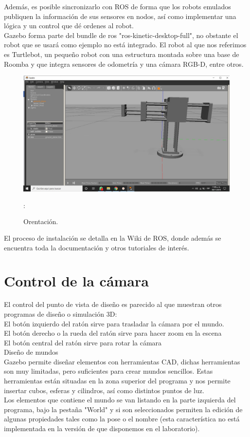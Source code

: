 \documentclass[11pt,a4paper,oldfontcommands,oneside]{memoir}
\begin{document}
Además, es posible sincronizarlo con ROS de forma que los robots emulados publiquen la información de sus sensores en nodos, así como implementar una lógica y un control que dé ordenes al robot.\\
Gazebo forma parte del bundle de ros "ros-kinetic-desktop-full", no obstante el robot que se usará como ejemplo no está integrado. El robot al que nos referimos es Turtlebot, un pequeño robot con una estructura montada sobre una base de Roomba y que integra sensores de odometría y una cámara RGB-D, entre otros.
\begin{figure}
\begin{center}
\includegraphics[scale=.30]{102.jpeg}
\end{center}
\caption{Orentación.}
\label{blender}:
\end{figure}
El proceso de instalación se detalla en la Wiki de ROS, donde además se encuentra toda la documentación y otros tutoriales de interés.
\chapter{Control de la cámara}
El control del punto de vista de diseño es parecido al que muestran otros programas de diseño o simulación 3D:\\

  El botón izquierdo del ratón sirve para trasladar la cámara por el mundo.\\
  El botón derecho o la rueda del ratón sirve para hacer zoom en la escena\\
  El botón central del ratón sirve para rotar la cámara\\
  
Diseño de mundos\\
Gazebo permite diseñar elementos con herramientas CAD, dichas herramientas son muy limitadas, pero suficientes para crear mundos sencillos.
Estas herramientas están situadas en la zona superior del programa y nos permite insertar cubos, esferas y cilindros, así como distintos puntos de luz.\\
Los elementos que contiene el mundo se van listando en la parte izquierda del programa, bajo la pestaña "World" y si son seleccionados permiten la edición de algunas propiedades tales como la pose o el nombre (esta característica no está implementada en la versión de que disponemos en el laboratorio).\\
\end{document}
